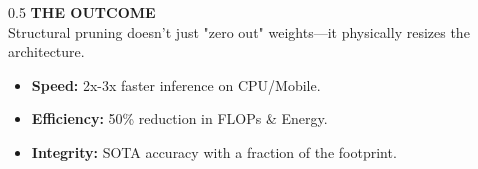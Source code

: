 \documentclass[10pt, aspectratio=169]{beamer}
\begin{document}
\begin{frame}
\begin{columns}[T]
        \begin{column}{0.5\textwidth}
            \vspace{0.4cm}
            \textbf{\small THE OUTCOME} \\
            \vspace{0.2cm}
            Structural pruning doesn't just "zero out" weights—it physically resizes the architecture. \\
            \vspace{0.4cm}
            \begin{itemize}
                \item \small \textbf{Speed:} 2x-3x faster inference on CPU/Mobile.
                \item \small \textbf{Efficiency:} 50\% reduction in FLOPs \& Energy.
                \item \small \textbf{Integrity:} SOTA accuracy with a fraction of the footprint.
            \end{itemize}
            \vspace{0.3cm}
        \end{column}
    \end{columns}
\end{frame}
\end{document}
